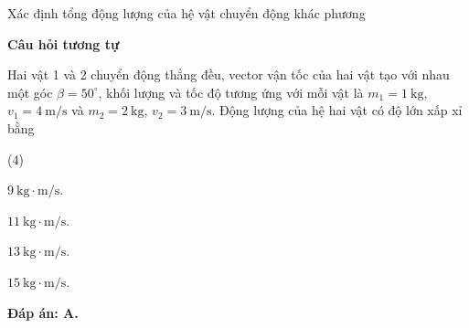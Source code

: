 \begin{dang}{Xác định tổng động lượng của hệ vật chuyển động khác phương}
{		\begin{center}
			\textbf{Câu hỏi tương tự}
		\end{center}
		
		Hai vật 1 và 2 chuyển động thẳng đều, vector vận tốc của hai vật tạo với nhau một góc $\beta = 50^\circ$, khối lượng và tốc độ tương ứng với mỗi vật là $m_1=\SI{1}{\kilogram}$, $v_1=\SI{4}{\meter/\second}$ và  $m_2=\SI{2}{\kilogram}$, $v_2=\SI{3}{\meter/\second}$. Động lượng của hệ hai vật có độ lớn xấp xỉ bằng
		\begin{mcq}(4)
			\item $9\ \text{kg} \cdot \text{m/s}$.	
			\item $11\ \text{kg} \cdot \text{m/s}$.
			\item $13\ \text{kg} \cdot \text{m/s}$.	
			\item $15\ \text{kg} \cdot \text{m/s}$.
		\end{mcq}
		
		\textbf{Đáp án: A.}
	}
	
\end{dang}
